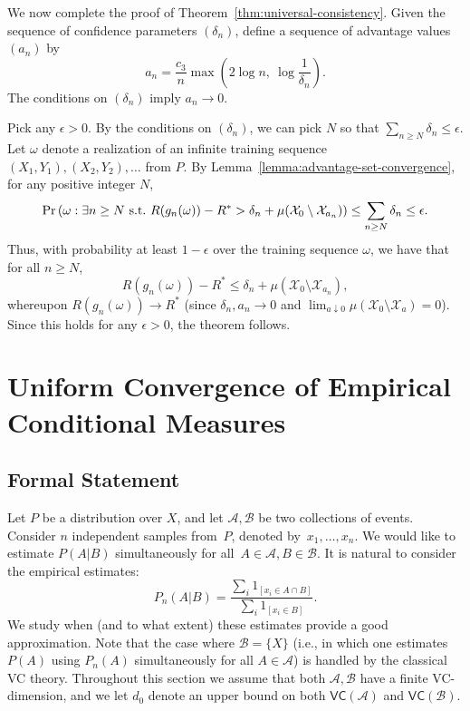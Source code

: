 \documentclass{article}
\def\pr{{\rm Pr}}
\def\X{{\mathcal X}}
\newcommand{\cA}{\mathcal{A}}
\newcommand{\cB}{\mathcal{B}}
\begin{document}
We now complete the proof of Theorem~\ref{thm:universal-consistency}. Given the sequence of confidence parameters $(\delta_n)$, define a sequence of advantage values $(a_n)$ by
$$ a_n = \frac{c_3}{n} \max \left( 2 \log n, \ \log \frac{1}{\delta_n} \right) .$$
The conditions on $(\delta_n)$ imply $a_n \rightarrow 0$.

Pick any $\epsilon > 0$. By the conditions on $(\delta_n)$, we can pick $N$ so that $\sum_{n \geq N} \delta_n \leq \epsilon$. Let $\omega$ denote a realization of an infinite training sequence $(X_1, Y_1), (X_2, Y_2), \ldots$ from $P$. By Lemma~\ref{lemma:advantage-set-convergence}, for any positive integer $N$,
$$ \pr \left(\omega: \exists n \geq N \mbox{\ s.t.\ } R(g_n(\omega)) - R^* > \delta_n + \mu(\X_0 \setminus \X_{a_n}) \right) \leq \sum_{n \geq N} \delta_n \leq \epsilon.$$
Thus, with probability at least $1-\epsilon$ over the training sequence $\omega$, we have that for all $n \geq N$,
$$ R(g_n(\omega)) - R^* \leq \delta_n + \mu(\X_0 \setminus \X_{a_n}) ,$$
whereupon $R(g_n(\omega)) \rightarrow R^*$ (since $\delta_n, a_n \rightarrow 0$ and $\lim_{a \downarrow 0} \mu(\X_0 \setminus \X_a) = 0$). Since this holds for any $\epsilon  >0$, the theorem follows.


\section{Uniform Convergence of Empirical Conditional Measures}
\label{sec:ucecm}

\subsection{Formal Statement}

Let $P$ be a distribution over $X$, and let $\cA,\cB$ be two collections of events.
Consider $n$ independent samples from~$P$, denoted by~$x_1,\ldots,x_n$.
We would like to estimate $P(A \vert B)$ simultaneously for all~$A\in\cA, B\in \cB$.
It is natural to consider the empirical estimates:
\[P_n(A\vert B)=\frac{\sum_i 1_{[x_i\in A \cap B]}}{\sum_i 1_{[x_i\in B]}}.\]
We study when (and to what extent) these estimates provide a good approximation.
Note that the case where $\cB=\{X\}$ (i.e., in which one estimates $P(A)$
using $P_n(A)$ simultaneously for all $A\in\cA$) is handled by the classical VC theory.
Throughout this section we assume that both $\cA,\cB$ have a finite VC-dimension, 
and we let $d_0$ denote an upper bound on both $\mathsf{VC}(\cA)$ and $\mathsf{VC}(\cB)$.
\end{document}
